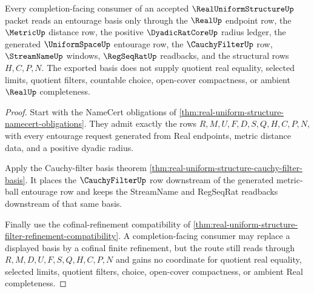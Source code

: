 \begin{theorem}
\label{thm:real-uniform-structure-completion-entourage-basis}
Every completion-facing consumer of an accepted $\RealUniformStructureUp$ packet reads an entourage basis only through the $\RealUp$ endpoint row, the $\MetricUp$ distance row, the positive $\DyadicRatCoreUp$ radius ledger, the generated $\UniformSpaceUp$ entourage row, the $\CauchyFilterUp$ row, $\StreamNameUp$ windows, $\RegSeqRatUp$ readbacks, and the structural rows $H,C,P,N$. The exported basis does not supply quotient real equality, selected limits, quotient filters, countable choice, open-cover compactness, or ambient $\RealUp$ completeness.
\end{theorem}
\begin{proof}
Start with the NameCert obligations of \autoref{thm:real-uniform-structure-namecert-obligations}. They admit exactly the rows $R,M,U,F,D,S,Q,H,C,P,N$, with every entourage request generated from Real endpoints, metric distance data, and a positive dyadic radius.

Apply the Cauchy-filter basis theorem \autoref{thm:real-uniform-structure-cauchy-filter-basis}. It places the $\CauchyFilterUp$ row downstream of the generated metric-ball entourage row and keeps the StreamName and RegSeqRat readbacks downstream of that same basis.

Finally use the cofinal-refinement compatibility of \autoref{thm:real-uniform-structure-filter-refinement-compatibility}. A completion-facing consumer may replace a displayed basis by a cofinal finite refinement, but the route still reads through $R,M,D,U,F,S,Q,H,C,P,N$ and gains no coordinate for quotient real equality, selected limits, quotient filters, choice, open-cover compactness, or ambient Real completeness.
\end{proof}

